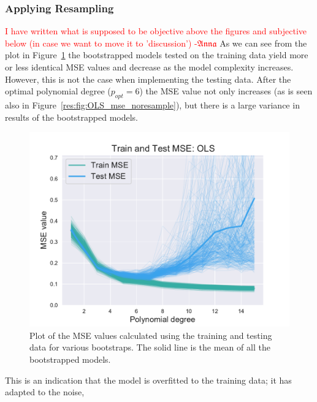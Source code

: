 \documentclass[twocolumn,english,notitlepage]{article}
\newcommand{\comment}[1]{\textcolor{red}{#1}}
\newcommand{\Anna}{$\mathfrak{Anna}$}
\begin{document}
        \subsubsection{Applying Resampling}
        \comment{I  have written what is supposed to be objective above the figures and subjective below (in case we want to move it to 'discussion') -\Anna}
            As we can see from the plot in Figure~\ref{res:fig:bs_train_test_ols} the bootstrapped models tested on the training data yield more or less identical MSE values and decrease as the model complexity increases. However, this is not the case when implementing the testing data. After the optimal polynomial degree ($ p_{opt} = 6$) the MSE value not only increases (as is seen also in Figure~\ref{res:fig:OLS_mse_noresample}), but there is a large variance in results of the bootstrapped models.  
            \begin{figure}[ht]
                \centering
                \includegraphics[width=.9\linewidth]{BS_train_test_mse_OLS.pdf}
                \caption{Plot of the MSE values calculated using the training and testing data for various bootstraps. The solid line is the mean of all the bootstrapped models.}
                \label{res:fig:bs_train_test_ols}
            \end{figure}
            This is an indication that the model is overfitted to the training data; it has adapted to the noise, 
  
\end{document}

